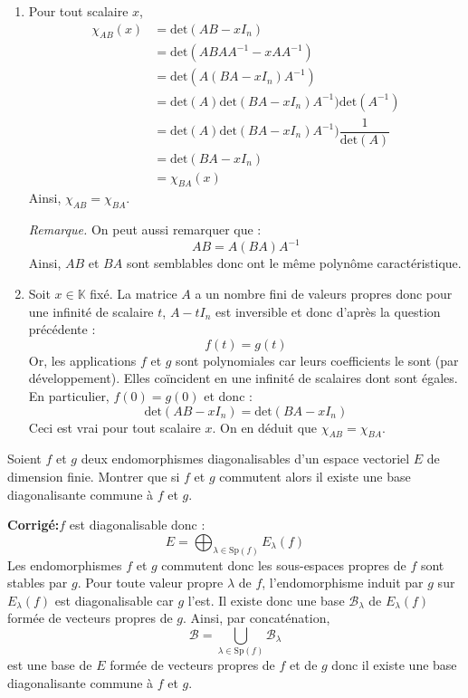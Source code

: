\documentclass[a4paper,twoside,french,10pt]{VcCours}
\newcommand{\corr}{\textbf{Corrigé:}}
\begin{document}
\begin{enumerate}
\item Pour tout scalaire $x$,
\begin{align*}
\chi_{AB}(x) & = \textrm{det}(AB-xI_n) \\
& = \textrm{det}(ABAA^{-1}-xA A^{-1}) \\
& = \textrm{det}(A(BA-xI_n) A^{-1}) \\
& = \textrm{det}(A)\textrm{det}(BA-xI_n) A^{-1})\textrm{det}(A^{-1}) \\
& = \textrm{det}(A)\textrm{det}(BA-xI_n) A^{-1}) \dfrac{1}{\textrm{det}(A)} \\
& = \textrm{det}(BA-xI_n) \\
& = \chi_{BA}(x)
\end{align*}
Ainsi, $\chi_{AB}= \chi_{BA}$.


\textit{Remarque.} On peut aussi remarquer que :
$$ AB=  A(BA)A^{-1}$$
Ainsi, $AB$ et $BA$ sont semblables donc ont le même polynôme caractéristique.
\item Soit $x \in \mathbb{K}$ fixé. La matrice $A$ a un nombre fini de valeurs propres donc pour une infinité de scalaire $t$, $A-t I_n$ est inversible et donc d'après la question précédente :
$$ f(t)=g(t)$$
Or, les applications $f$ et $g$ sont polynomiales car leurs coefficients le sont (par développement). Elles coïncident en une infinité de scalaires dont sont égales. En particulier, $f(0)=g(0)$ et donc :
$$ \textrm{det}(AB-xI_n)= \textrm{det}(BA-xI_n)$$
Ceci est vrai pour tout scalaire $x$. On en déduit que $\chi_{AB}= \chi_{BA}$.
\end{enumerate}

\begin{Exercice}{}  Soient $f$ et $g$ deux endomorphismes diagonalisables d'un espace vectoriel $E$ de dimension finie. Montrer que si $f$ et $g$ commutent alors il existe une base diagonalisante commune à $f$ et $g$.
\end{Exercice}

\corr $f$ est diagonalisable donc :
$$ E = \bigoplus_{\lambda \in \textrm{Sp}(f)} E_{\lambda}(f)$$
Les endomorphismes $f$ et $g$ commutent donc les sous-espaces propres de $f$ sont stables par $g$. Pour toute valeur propre $\lambda$ de $f$, l'endomorphisme induit par $g$ sur $E_{\lambda}(f)$ est diagonalisable car $g$ l'est. Il existe donc une base $\mathcal{B}_{\lambda}$ de $E_{\lambda}(f)$ formée de vecteurs propres de $g$. Ainsi, par concaténation,
$$ \mathcal{B} = \bigcup_{\lambda  \in \textrm{Sp}(f)} \mathcal{B}_{\lambda}$$
est une base de $E$ formée de vecteurs propres de $f$ et de $g$ donc il existe une base diagonalisante commune à $f$ et $g$.
\end{document}
